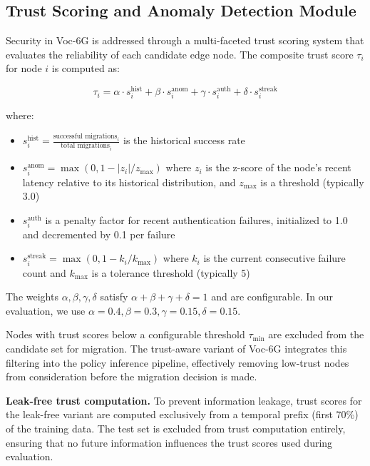 \documentclass[journal,twoside]{IEEEtran}
\newcommand{\VocSixG}{Voc-6G}
\begin{document}
\subsection{Trust Scoring and Anomaly Detection Module}
\label{sec:trust}

Security in \VocSixG{} is addressed through a multi-faceted trust scoring system that evaluates the reliability of each candidate edge node. The composite trust score $\tau_i$ for node $i$ is computed as:

\begin{equation}
\tau_i = \alpha \cdot s_i^{\text{hist}} + \beta \cdot s_i^{\text{anom}} + \gamma \cdot s_i^{\text{auth}} + \delta \cdot s_i^{\text{streak}}
\label{eq:trust}
\end{equation}

where:
\begin{itemize}
    \item $s_i^{\text{hist}} = \frac{\text{successful migrations}_i}{\text{total migrations}_i}$ is the historical success rate
    \item $s_i^{\text{anom}} = \max(0, 1 - |z_i| / z_{\max})$ where $z_i$ is the z-score of the node's recent latency relative to its historical distribution, and $z_{\max}$ is a threshold (typically 3.0)
    \item $s_i^{\text{auth}}$ is a penalty factor for recent authentication failures, initialized to 1.0 and decremented by 0.1 per failure
    \item $s_i^{\text{streak}} = \max(0, 1 - k_i / k_{\max})$ where $k_i$ is the current consecutive failure count and $k_{\max}$ is a tolerance threshold (typically 5)
\end{itemize}

The weights $\alpha, \beta, \gamma, \delta$ satisfy $\alpha + \beta + \gamma + \delta = 1$ and are configurable. In our evaluation, we use $\alpha=0.4, \beta=0.3, \gamma=0.15, \delta=0.15$.

Nodes with trust scores below a configurable threshold $\tau_{\min}$ are excluded from the candidate set for migration. The trust-aware variant of \VocSixG{} integrates this filtering into the policy inference pipeline, effectively removing low-trust nodes from consideration before the migration decision is made.

\textbf{Leak-free trust computation.} To prevent information leakage, trust scores for the leak-free variant are computed exclusively from a temporal prefix (first 70\%) of the training data. The test set is excluded from trust computation entirely, ensuring that no future information influences the trust scores used during evaluation.
\end{document}
